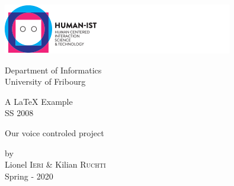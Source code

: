 
\begin{titlepage} 
	\begin{center}
		
		\includegraphics[scale=.6]{Report/images/human-ist.png}\\
		
		\vspace{0.5cm}
		
		Department of Informatics\\
		University of Fribourg\\

		\vspace{3cm}
		
		\begin{large}
		A \LaTeX{} Example\\
		SS 2008\\
		\end{large}
		
		\vspace{3cm}
		
		\begin{huge}
			{\sf Our voice controled project}
		\end{huge}
		
				
		\vspace{3cm}
		
		\begin{large}
			\vspace{1cm}
			 by\\
			 Lionel \textsc{Ieri} & Kilian \textsc{Ruchti}\\
			\vspace{0.2cm}
			Spring - 2020
		\end{large}
				
	\end{center}
\end{titlepage}
